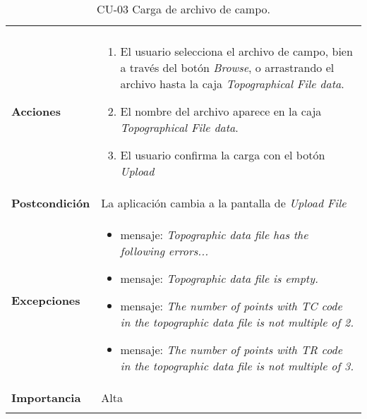 \begin{longtable}[H]{@{}ll@{}}
\begin{minipage}[t]{0.71\columnwidth}
\end{minipage}\tabularnewline
\begin{minipage}[t]{0.23\columnwidth}\raggedright\strut
\textbf{Acciones}\strut
\end{minipage} & \begin{minipage}[t]{0.71\columnwidth}%
\begin{enumerate}
\def\labelenumi{\arabic{enumi}.}
\tightlist
\item
  El usuario selecciona el archivo de campo, bien a través del botón \emph{Browse}, o arrastrando el archivo hasta la caja \emph{Topographical File data}.
\item
  El nombre del archivo aparece en la caja \emph{Topographical File data}.
\item
  El usuario confirma la carga con el botón \emph{Upload}
\end{enumerate}%
\end{minipage}\tabularnewline
\begin{minipage}[t]{0.23\columnwidth}\raggedright\strut
\textbf{Postcondición}\strut
\end{minipage} & \begin{minipage}[t]{0.71\columnwidth}\raggedright\strut
La aplicación cambia a la pantalla de \emph{Upload File}
\end{minipage}\tabularnewline
\begin{minipage}[t]{0.23\columnwidth}%
\textbf{Excepciones}\strut
\end{minipage} & \begin{minipage}[t]{0.71\columnwidth}%
\begin{itemize}
\tightlist
\item
  mensaje: \textit{Topographic data file has the following errors...}
\item
  mensaje: \textit{Topographic data file is empty.}
\item
  mensaje: \textit{The number of points with \textit{TC} code in the topographic data file is not multiple of 2.}  
\item
  mensaje: \textit{The number of points with \textit{TR} code in the topographic data file is not multiple of 3.}  
\end{itemize}\strut
\end{minipage}\tabularnewline
\begin{minipage}[t]{0.23\columnwidth}%
\textbf{Importancia}\strut
\end{minipage} & \begin{minipage}[t]{0.71\columnwidth}%
Alta\strut
\end{minipage}\tabularnewline
\bottomrule
\caption{CU-03 Carga de archivo de campo.}
\end{longtable}


